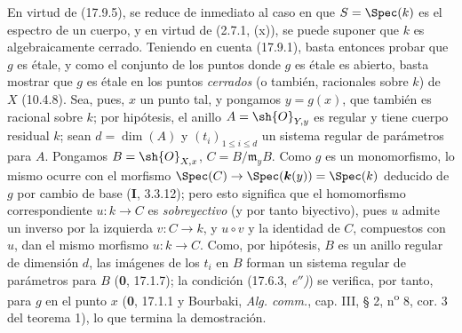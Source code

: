 En virtud de (17.9.5), se reduce de inmediato al caso en que $S=\Spec(k)$ es el espectro de un cuerpo, y en virtud de (2.7.1, (x)), se puede suponer que $k$ es algebraicamente cerrado. Teniendo en cuenta (17.9.1), basta entonces probar que $g$ es étale, y como el conjunto de los puntos donde $g$ es étale es abierto, basta mostrar que $g$ es étale en los puntos \emph{cerrados} (o también, racionales sobre $k$) de $X$ (10.4.8). Sea, pues, $x$ un punto tal, y pongamos $y=g(x)$, que también es racional sobre $k$; por hipótesis, el anillo $A=\sh{O}_{Y,y}$ es regular y tiene cuerpo residual $k$; sean $d=\dim(A)$ y $(t_i)_{1\leq i\leq d}$ un sistema regular de parámetros para $A$. Pongamos $B=\sh{O}_{X,x}$, $C=B/\mathfrak m_yB$. Como $g$ es un monomorfismo, lo mismo ocurre con el morfismo $\Spec(C)\to\Spec(\boldsymbol{k}(y))=\Spec(k)$ deducido de $g$ por cambio de base (\textbf I, 3.3.12); pero esto significa que el homomorfismo correspondiente $u:k\to C$ es \emph{sobreyectivo} (y por tanto biyectivo), pues $u$ admite un inverso por la izquierda $v:C\to k$, y $u\circ v$ y la identidad de $C$, compuestos con $u$, dan el mismo morfismo $u:k\to C$. Como, por hipótesis, $B$ es un anillo regular de dimensión $d$, las imágenes de los $t_i$ en $B$ forman un sistema regular de parámetros para $B$ (\textbf 0, 17.1.7); la condición (17.6.3, \emph{e$''$)}) se verifica, por tanto, para $g$ en el punto $x$ (\textbf 0, 17.1.1 y Bourbaki, \emph{Alg. comm.}, cap. III, § 2, n\textsuperscript{o} 8, cor. 3 del teorema 1), lo que termina la demostración.
